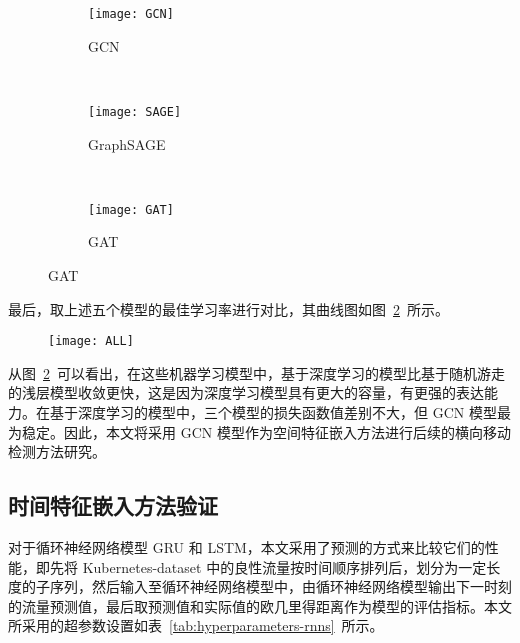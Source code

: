 {\begin{figure}[!htbp]
    \centering
    \begin{subfigure}[b]{0.48\textwidth}
      \texttt{[image: GCN]}
      \caption{GCN}
    \end{subfigure}
    ~
    \begin{subfigure}[b]{0.48\textwidth}
      \texttt{[image: SAGE]}
      \caption{GraphSAGE}
    \end{subfigure}
    \\
    \begin{subfigure}[b]{0.48\textwidth}
      \texttt{[image: GAT]}
      \caption{GAT}
    \end{subfigure}
    \label{fig:gnns}
\end{figure}

最后，取上述五个模型的最佳学习率进行对比，其曲线图如图~\ref{fig:graph-plots}~所示。

\begin{figure}[!htbp]
    \centering
    \texttt{[image: ALL]}
    \label{fig:graph-plots}
\end{figure}

从图~\ref{fig:graph-plots}~可以看出，在这些机器学习模型中，基于深度学习的模型比基于随机游走的浅层模型收敛更快，这是因为深度学习模型具有更大的容量，有更强的表达能力。在基于深度学习的模型中，三个模型的损失函数值差别不大，但 GCN 模型最为稳定。因此，本文将采用 GCN 模型作为空间特征嵌入方法进行后续的横向移动检测方法研究。

\subsection{时间特征嵌入方法验证}

对于循环神经网络模型 GRU 和 LSTM，本文采用了预测的方式来比较它们的性能，即先将 Kubernetes-dataset 中的良性流量按时间顺序排列后，划分为一定长度的子序列，然后输入至循环神经网络模型中，由循环神经网络模型输出下一时刻的流量预测值，最后取预测值和实际值的欧几里得距离作为模型的评估指标。本文所采用的超参数设置如表~\ref{tab:hyperparameters-rnns}~所示。

}
